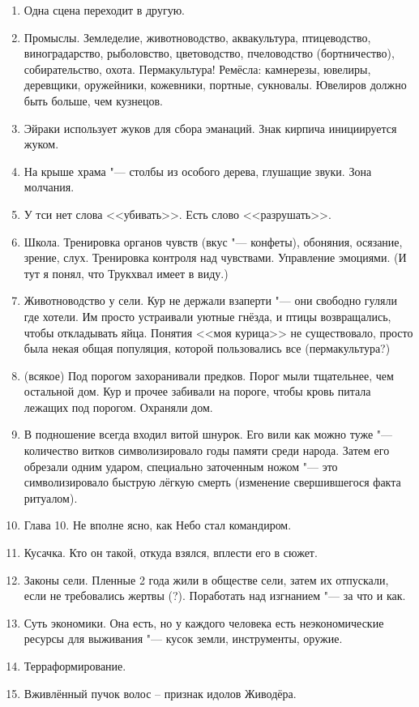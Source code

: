 \documentclass[a4paper,10pt]{book}
\begin{document}
\begin{enumerate}
\item Одна сцена переходит в другую.
\item Промыслы. Земледелие, животноводство, аквакультура, птицеводство, 
виноградарство, рыболовство, цветоводство, пчеловодство (бортничество), 
собирательство, охота. Пермакультура! Ремёсла: камнерезы, ювелиры, деревщики, 
оружейники,
кожевники,
портные,
сукновалы.
Ювелиров должно быть больше, чем кузнецов.
\item Эйраки использует жуков для сбора эманаций. Знак кирпича инициируется 
жуком.
\item На крыше храма "--- столбы из особого дерева, глушащие звуки. Зона 
молчания.
\item У тси нет слова <<убивать>>. Есть слово <<разрушать>>.
\item Школа. Тренировка органов чувств (вкус "--- конфеты), обоняния, осязание, 
зрение, слух. Тренировка контроля над чувствами. Управление эмоциями. (И тут я 
понял, что Трукхвал имеет в виду.)
\item Животноводство у сели. Кур не держали взаперти "--- они свободно гуляли 
где хотели. Им просто устраивали уютные гнёзда, и птицы возвращались, чтобы 
откладывать яйца. Понятия <<моя курица>> не существовало, просто была некая 
общая популяция, которой пользовались все (пермакультура?)
\item (всякое) Под порогом захоранивали предков. Порог мыли тщательнее, чем 
остальной дом. Кур и прочее забивали на пороге, чтобы кровь питала лежащих под 
порогом. Охраняли дом.
\item В подношение всегда входил витой шнурок. Его вили как можно туже "--- 
количество витков символизировало годы памяти среди народа. Затем его обрезали 
одним ударом, специально заточенным ножом "--- это символизировало быструю 
лёгкую смерть (изменение свершившегося факта ритуалом).
\item Глава 10. Не вполне ясно, как Небо стал командиром.
\item Кусачка. Кто он такой, откуда взялся, вплести его в сюжет.
\item Законы сели. Пленные 2 года жили в обществе сели, затем их отпускали, 
если не требовались жертвы (?). Поработать над изгнанием "--- за что и как.
\item Суть экономики. Она есть, но у каждого человека есть неэкономические 
ресурсы для выживания "--- кусок земли, инструменты, оружие.
\item Терраформирование.
\item Вживлённый пучок волос -- признак идолов Живодёра.

\end{enumerate}
\end{document}
